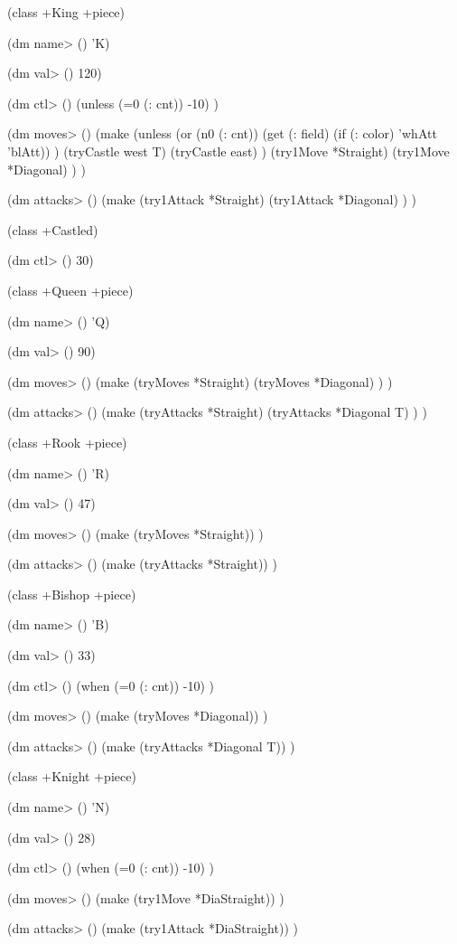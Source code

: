\begin{wideverbatim}

 
(class +King +piece)
 
(dm name> () 'K)
 
(dm val> () 120)
 
(dm ctl> ()
   (unless (=0 (: cnt)) -10) )
 
(dm moves> ()
   (make
      (unless
         (or
            (n0 (: cnt))
            (get (: field) (if (: color) 'whAtt 'blAtt)) )
         (tryCastle west T)
         (tryCastle east) )
      (try1Move *Straight)
      (try1Move *Diagonal) ) )
 
(dm attacks> ()
   (make
      (try1Attack *Straight)
      (try1Attack *Diagonal) ) )
 
 
(class +Castled)
 
(dm ctl> () 30)
 
 
(class +Queen +piece)
 
(dm name> () 'Q)
 
(dm val> () 90)
 
(dm moves> ()
   (make
      (tryMoves *Straight)
      (tryMoves *Diagonal) ) )
 
(dm attacks> ()
   (make
      (tryAttacks *Straight)
      (tryAttacks *Diagonal T) ) )
 

\end{wideverbatim}

\begin{wideverbatim}

 
(class +Rook +piece)
 
(dm name> () 'R)
 
(dm val> () 47)
 
(dm moves> ()
   (make (tryMoves *Straight)) )
 
(dm attacks> ()
   (make (tryAttacks *Straight)) )
 
 
(class +Bishop +piece)
 
(dm name> () 'B)
 
(dm val> () 33)
 
(dm ctl> ()
   (when (=0 (: cnt)) -10) )
 
(dm moves> ()
   (make (tryMoves *Diagonal)) )
 
(dm attacks> ()
   (make (tryAttacks *Diagonal T)) )
 
 
(class +Knight +piece)
 
(dm name> () 'N)
 
(dm val> () 28)
 
(dm ctl> ()
   (when (=0 (: cnt)) -10) )
 
(dm moves> ()
   (make (try1Move *DiaStraight)) )
 
(dm attacks> ()
   (make (try1Attack *DiaStraight)) )


\end{wideverbatim}

